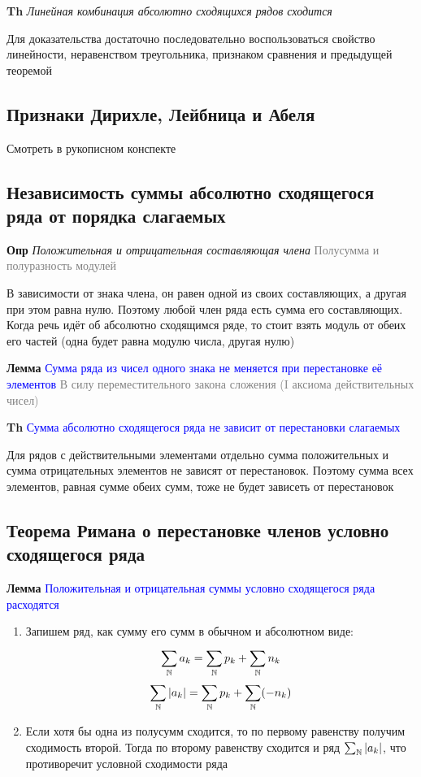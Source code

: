 \textbf{Th} \textit{Линейная комбинация абсолютно сходящихся рядов сходится}

Для доказательства достаточно последовательно воспользоваться свойство линейности, неравенством треугольника,
признаком сравнения и предыдущей теоремой

\subsection{Признаки Дирихле, Лейбница и Абеля}

Смотреть в рукописном конспекте

\subsection{Независимость суммы абсолютно сходящегося ряда от порядка слагаемых}

\textbf{Опр} \textit{Положительная и отрицательная составляющая члена} \textcolor{gray}{Полусумма и полуразность
модулей}

В зависимости от знака члена, он равен одной из своих составляющих, а другая при этом равна нулю.
Поэтому любой член ряда есть сумма его составляющих.
Когда речь идёт об абсолютно сходящимся ряде, то стоит взять модуль от обеих его частей (одна будет равна модулю
числа, другая нулю)

\textbf{Лемма} \textcolor{blue}{Сумма ряда из чисел одного знака не меняется при перестановке её элементов} \textcolor{gray}{В
силу переместительного закона сложения (I аксиома действительных чисел)}

\textbf{Th} \textcolor{blue}{Сумма абсолютно сходящегося ряда не зависит от перестановки слагаемых}

Для рядов с действительными элементами отдельно сумма положительных и сумма отрицательных элементов не
зависят от перестановок.
Поэтому сумма всех элементов, равная сумме обеих сумм, тоже не будет зависеть от перестановок

\subsection{Теорема Римана о перестановке членов условно сходящегося ряда}

\textbf{Лемма} \textcolor{blue}{Положительная и отрицательная суммы условно сходящегося ряда расходятся}

\begin{enumerate}
    \item Запишем ряд, как сумму его сумм в обычном и абсолютном виде:
    \begin{gather*}
        \sum_{\mathbb{N}}^{}a_k = \sum_{\mathbb{N}}^{}p_k + \sum_{\mathbb{N}}^{}n_k\\
        \sum_{\mathbb{N}}^{} \abs{a_k} = \sum_{\mathbb{N}}^{}p_k + \sum_{\mathbb{N}}^{}(-n_k)
    \end{gather*}
    \item Если хотя бы одна из полусумм сходится, то по первому равенству получим сходимость второй.
    Тогда по второму равенству сходится и ряд $\sum_{\mathbb{N}}^{} \abs{a_k}$, что противоречит условной сходимости ряда
\end{enumerate}

